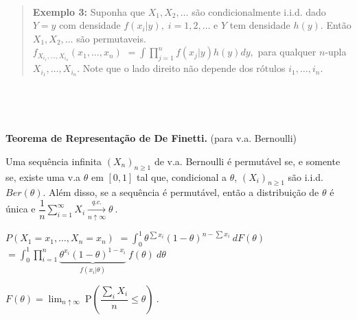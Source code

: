 \documentclass[
]{book}
\begin{document}
\(~\)

\begin{quote}
\textbf{Exemplo 3:} Suponha que \(X_1,X_2,\ldots\) são condicionalmente i.i.d. dado \(Y=y\) com densidade \(f(x_i|y),\;i=1,2,\ldots\) e \(Y\) tem densidade \(h(y)\). Então \(X_1,X_2,\ldots\) são permutaveis.\\
\(f_{X_{i_1},\ldots,X_{i_n}}(x_1,\ldots,x_n)\) \(=\displaystyle\int\prod_{j=1}^nf(x_j|y)h(y)dy,\) para qualquer \(n\)-upla \(X_{i_1},\ldots,X_{i_n}\). Note que o lado direito não depende dos rótulos \(i_1,\ldots,i_n\).
\end{quote}

\(~\)

\(~\)

\textbf{Teorema de Representação de De Finetti.} (para v.a. Bernoulli)

Uma sequência infinita \(\left(X_n\right)_{n\geq 1}\) de v.a. Bernoulli é permutável se, e somente se, existe uma v.a \(\theta\) em \([0,1]\) tal que, condicional a \(\theta\), \(\left(X_i\right)_{n\geq 1}\) são i.i.d. \(Ber(\theta)\). Além disso, se a sequência é permutável, então a distribuição de \(\theta\) é única e \(\displaystyle\dfrac{1}{n}\sum_{i=1}^\infty X_i \underset{n\uparrow\infty}{\overset{q.c.}{\longrightarrow}}\theta~.\)

\(P(X_1=x_1,\ldots,X_n=x_n)\) \(=\displaystyle\int_0^1\theta^{\sum x_i}(1-\theta)^{n-\sum x_i}~dF(\theta)\) \(=\displaystyle\int_0^1\prod_{i=1}^n\underbrace{\theta^{x_i}(1-\theta)^{1-x_i}}_{f(x_i|\theta)}~f(\theta)~d\theta\)

\(F(\theta)=\displaystyle\lim_{n\uparrow\infty}~\text{P}\left(\dfrac{\sum_iX_i}{n}\leq \theta\right)~.\)

\(~\)

\(~\)
\end{document}
